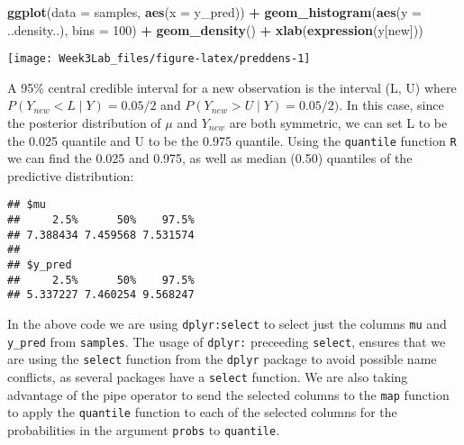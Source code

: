 \documentclass[]{article}
\newenvironment{Shaded}{\begin{snugshade}}{\end{snugshade}}
\newcommand{\KeywordTok}[1]{\textcolor[rgb]{0.13,0.29,0.53}{\textbf{#1}}}
\newcommand{\DataTypeTok}[1]{\textcolor[rgb]{0.13,0.29,0.53}{#1}}
\newcommand{\DecValTok}[1]{\textcolor[rgb]{0.00,0.00,0.81}{#1}}
\newcommand{\FloatTok}[1]{\textcolor[rgb]{0.00,0.00,0.81}{#1}}
\newcommand{\StringTok}[1]{\textcolor[rgb]{0.31,0.60,0.02}{#1}}
\newcommand{\OperatorTok}[1]{\textcolor[rgb]{0.81,0.36,0.00}{\textbf{#1}}}
\newcommand{\NormalTok}[1]{#1}
\begin{document}
\begin{Shaded}
\begin{Highlighting}[]
\KeywordTok{ggplot}\NormalTok{(}\DataTypeTok{data =}\NormalTok{ samples, }\KeywordTok{aes}\NormalTok{(}\DataTypeTok{x =}\NormalTok{ y_pred)) }\OperatorTok{+}\StringTok{ }
\StringTok{  }\KeywordTok{geom_histogram}\NormalTok{(}\KeywordTok{aes}\NormalTok{(}\DataTypeTok{y =}\NormalTok{ ..density..), }\DataTypeTok{bins =} \DecValTok{100}\NormalTok{) }\OperatorTok{+}
\StringTok{  }\KeywordTok{geom_density}\NormalTok{() }\OperatorTok{+}\StringTok{ }
\StringTok{  }\KeywordTok{xlab}\NormalTok{(}\KeywordTok{expression}\NormalTok{(y[new]))}
\end{Highlighting}
\end{Shaded}

\begin{center}\texttt{[image: Week3Lab\_files/figure-latex/preddens-1]} \end{center}

A 95\% central credible interval for a new observation is the interval
(L, U) where \(P(Y_{new} < L \mid Y) = 0.05/2\) and
\(P(Y_{new} > U \mid Y) = 0.05/2)\). In this case, since the posterior
distribution of \(\mu\) and \(Y_{new}\) are both symmetric, we can set L
to be the 0.025 quantile and U to be the 0.975 quantile. Using the
\texttt{quantile} function \texttt{R} we can find the 0.025 and 0.975,
as well as median (0.50) quantiles of the predictive distribution:

\begin{Shaded}
\end{Shaded}

\begin{verbatim}
## $mu
##     2.5%      50%    97.5% 
## 7.388434 7.459568 7.531574 
## 
## $y_pred
##     2.5%      50%    97.5% 
## 5.337227 7.460254 9.568247
\end{verbatim}

In the above code we are using \texttt{dplyr:select} to select just the
columns \texttt{mu} and \texttt{y\_pred} from \texttt{samples}. The
usage of \texttt{dplyr:} preceeding \texttt{select}, ensures that we are
using the \texttt{select} function from the \texttt{dplyr} package to
avoid possible name conflicts, as several packages have a
\texttt{select} function. We are also taking advantage of the pipe
operator to send the selected columns to the \texttt{map} function to
apply the \texttt{quantile} function to each of the selected columns for
the probabilities in the argument \texttt{probs} to \texttt{quantile}.
\end{document}
